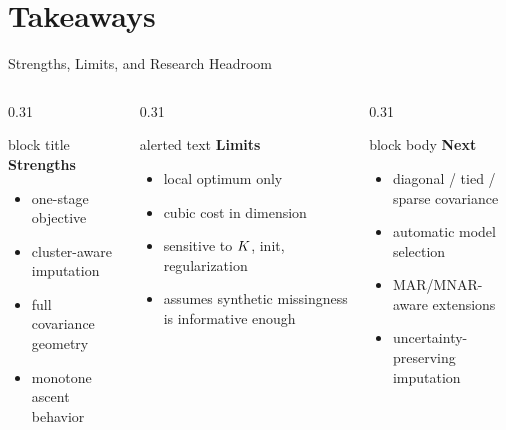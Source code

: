 \section{Takeaways}

\begin{frame}[shrink=4]{Strengths, Limits, and Research Headroom}
    \begin{columns}[T,onlytextwidth]
        \begin{column}{0.31\textwidth}
            \begin{beamercolorbox}[sep=0.8em, rounded=true, shadow=true]{block title}
                \textbf{Strengths}
            \end{beamercolorbox}
            \begin{itemize}
                \item one-stage objective
                \item cluster-aware imputation
                \item full covariance geometry
                \item monotone ascent behavior
            \end{itemize}
        \end{column}
        \begin{column}{0.31\textwidth}
            \begin{beamercolorbox}[sep=0.8em, rounded=true, shadow=true]{alerted text}
                \textbf{Limits}
            \end{beamercolorbox}
            \begin{itemize}
                \item local optimum only
                \item cubic cost in dimension
                \item sensitive to \(K\), init, regularization
                \item assumes synthetic missingness is informative enough
            \end{itemize}
        \end{column}
        \begin{column}{0.31\textwidth}
            \begin{beamercolorbox}[sep=0.8em, rounded=true, shadow=true]{block body}
                \textbf{Next}
            \end{beamercolorbox}
            \begin{itemize}
                \item diagonal / tied / sparse covariance
                \item automatic model selection
                \item MAR/MNAR-aware extensions
                \item uncertainty-preserving imputation
            \end{itemize}
        \end{column}
    \end{columns}
\end{frame}


